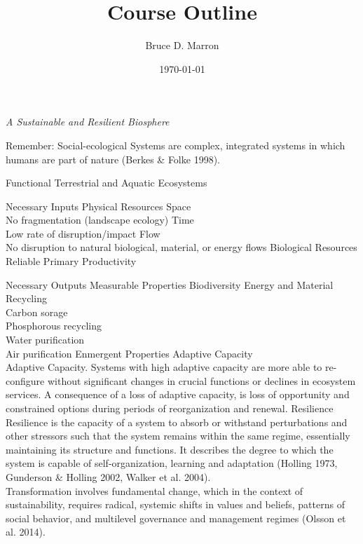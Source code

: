 \documentclass[12pt, letterpaper]{article}
\title{\vspace{-15mm}\fontsize{14pt}{10pt}
                    \selectfont \textbf{Course Outline}   %
                    \vspace{-7mm}
      }
\author{
     \normalsize Bruce D. Marron \\                     %
     \vspace{-5mm}
}
\date{\normalsize \today}
\begin{document}
\begin{singlespacing}
\end{singlespacing}
\thispagestyle{fancy}                           %

\large
\begin{flushleft}
\textit{A Sustainable and Resilient Biosphere}
\end{flushleft}

\normalsize
Remember: Social-ecological Systems are complex, integrated systems in which humans are part of nature (Berkes \& Folke 1998).

\begin{outline}[enumerate]
\1 Functional Terrestrial and Aquatic Ecosystems

\2 Necessary Inputs
\3 Physical Resources
\4 Space\\
No fragmentation (landscape ecology)
\4 Time\\
Low rate of disruption/impact
\4 Flow\\
No disruption to natural biological, material, or energy flows
\3 Biological Resources
\4 Reliable Primary Productivity

\2 Necessary Outputs
\3 Measurable Properties
\4 Biodiversity
\4 Energy and Material Recycling\\
Carbon sorage\\
Phosphorous recycling\\
Water purification\\
Air purification
\3 Enmergent Properties
\4 Adaptive Capacity\\
Adaptive Capacity. Systems with high adaptive capacity are more able to re-configure without significant changes in crucial functions or declines in ecosystem services. A consequence of a loss of adaptive capacity, is loss of opportunity and constrained options during periods of reorganization and renewal.
\4 Resilience \\
Resilience is the capacity of a system to absorb or withstand perturbations and other stressors such that the system remains within the same regime, essentially maintaining its structure and functions. It describes the degree to which the system is capable of self-organization, learning and adaptation (Holling 1973, Gunderson \& Holling 2002, Walker et al. 2004). \\

Transformation involves fundamental change, which in the context of sustainability, requires radical, systemic shifts in values and beliefs, patterns of social behavior, and multilevel governance and management regimes (Olsson et al. 2014).\\



\end{outline}




\clearpage 
\renewcommand{\thepage}{}
\printbibliography
\end{document}
